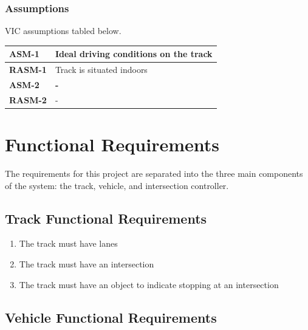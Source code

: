 \documentclass [12pt]{article}
\begin{document}
\subsubsection{Assumptions}
VIC assumptions tabled below. 
\begin{longtable}{| p{ } | p{ } | }\hline 
\textbf{ASM-1} & \textbf{Ideal driving conditions on the track} \\ \hline
\textbf{RASM-1} & Track is situated indoors \\ \hline \hline
\textbf{ASM-2} & \textbf{-} \\ \hline
\textbf{RASM-2} & - \\ \hline


\end{longtable}




\section {Functional Requirements} 
The requirements for this project are separated into the three main components of the system: the track, vehicle, and intersection controller.



\subsection{Track Functional Requirements}
\begin{enumerate}[label=\textbf{TRK\arabic*:},leftmargin =0.8in]
	\item The track must have lanes
	\item The track must have an intersection
	\item The track must have an object to indicate stopping at an intersection
\end{enumerate}


\subsection{Vehicle Functional Requirements}
\end{document}
